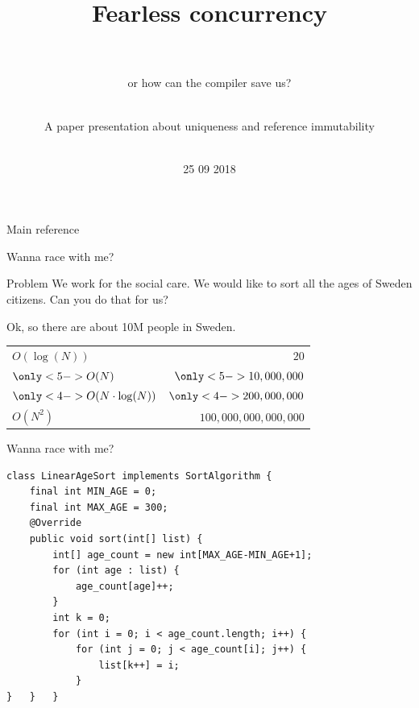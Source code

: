 \documentclass[handout]{beamer} %
\title{\centering Fearless concurrency \\ ~}
\subtitle{ or how can the compiler save us?}
\author{\centering ~ \\ A paper presentation about uniqueness and reference immutability \\ ~}
\institute{Thomas Lacroix \\ KTH -- Pardis 18}
\date{25 09 2018}
\begin{document}

\begin{frame}
    \maketitle
\end{frame}


\begin{frame}{Main reference}
    \nocite{*}
    
    
\end{frame}


\begin{frame}{Wanna race with me?}
	\begin{block}{Problem}
	We work for the social care. We would like to sort all the ages of Sweden
	citizens. Can you do that for us?
	\end{block}
	\vfill\pause
	Ok, so there are about 10M people in Sweden.
	\vfill\pause
	\centering
	\newcommand{\blue}{\only<4->{\color{blue}}}
	\newcommand{\green}{\only<5->{\color{dkgreen}}}
	\begin{tabular}{|l|r|}
		\hline
		$ O(\log(N))               $ & $                  20 $ \\
		$ \green O(N)              $ & $ \green   10,000,000 $ \\
		$ \blue O(N \cdot \log(N)) $ & $ \blue   200,000,000 $ \\
		$ O(N^2)                   $ & $ 100,000,000,000,000 $ \\
		\hline
	\end{tabular}
\end{frame}


\begin{frame}[fragile]{Wanna race with me?}
	\begin{lstlisting}
class LinearAgeSort implements SortAlgorithm {
    final int MIN_AGE = 0;
    final int MAX_AGE = 300;
    @Override
    public void sort(int[] list) {
        int[] age_count = new int[MAX_AGE-MIN_AGE+1];
        for (int age : list) {
            age_count[age]++;
        }
        int k = 0;
        for (int i = 0; i < age_count.length; i++) {
            for (int j = 0; j < age_count[i]; j++) {
                list[k++] = i;
            }
}   }   }
	\end{lstlisting}
\end{frame}
\end{document}

